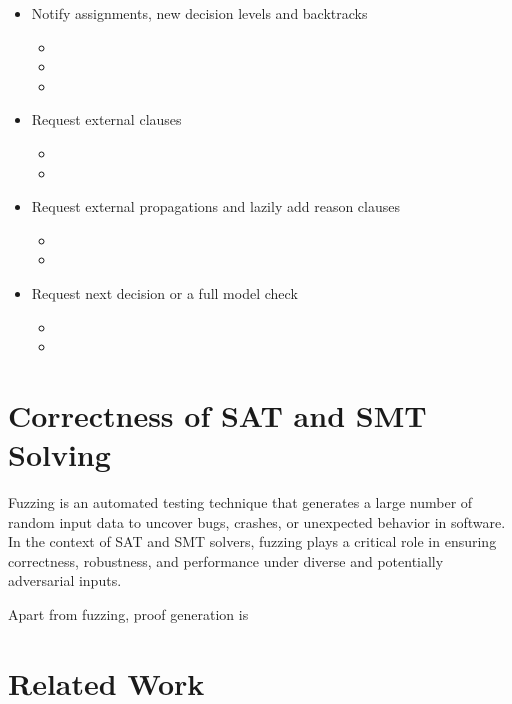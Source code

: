 \begin{itemize}
  \item Notify assignments, new decision levels and backtracks
    \begin{itemize}
      \item {}
      \item {}
      \item {}
    \end{itemize}
  \item Request external clauses
    \begin{itemize}
      \item {}
      \item {}
    \end{itemize}
  \item Request external propagations and lazily add reason clauses
    \begin{itemize}
      \item {}
      \item {}
    \end{itemize}
  \item Request next decision or a full model check
    \begin{itemize}
      \item {}
      \item {}
    \end{itemize}
\end{itemize}


\section{Correctness of SAT and SMT Solving}

Fuzzing is an automated testing technique that generates a large number of random input data to uncover bugs, crashes, or unexpected behavior in software. In the context of SAT and SMT solvers, fuzzing plays a critical role in ensuring correctness, robustness, and performance under diverse and potentially adversarial inputs.

Apart from fuzzing, proof generation is 

\section{Related Work}


